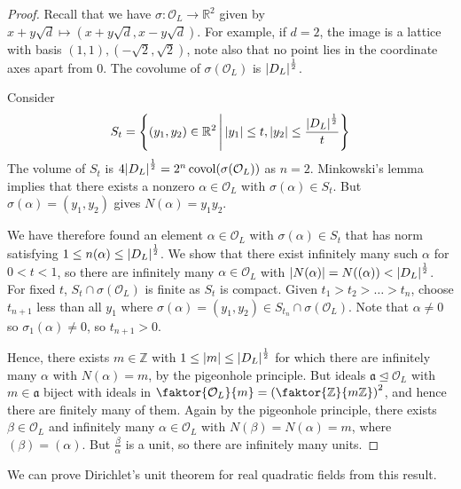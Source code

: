 \begin{proof}
    Recall that we have \( \sigma \colon \mathcal O_L \to \mathbb R^2 \) given by \( x + y\sqrt{d} \mapsto (x + y \sqrt{d}, x - y \sqrt{d}) \).
    For example, if \( d = 2 \), the image is a lattice with basis \( (1,1), (-\sqrt{2}, \sqrt{2}) \), note also that no point lies in the coordinate axes apart from 0.
    The covolume of \( \sigma(\mathcal O_L) \) is \( \abs{D_L}^{\frac{1}{2}} \).

    Consider
    \[ S_t = \qty{(y_1, y_2) \in \mathbb R^2 \,\middle|\,\abs{y_1} \leq t, \abs{y_2} \leq \frac{\abs{D_L}^{\frac{1}{2}}}{t}} \]
    The volume of \( S_t \) is \( 4\abs{D_L}^{\frac{1}{2}} = 2^n \operatorname{covol}(\sigma(\mathcal O_L)) \) as \( n = 2 \).
    Minkowski's lemma implies that there exists a nonzero \( \alpha \in \mathcal O_L \) with \( \sigma(\alpha) \in S_t \).
    But \( \sigma(\alpha) = (y_1, y_2) \) gives \( N(\alpha) = y_1 y_2 \).

    We have therefore found an element \( \alpha \in \mathcal O_L \) with \( \sigma(\alpha) \in S_t \) that has norm satisfying \( 1 \leq n(\alpha) \leq \abs{D_L}^{\frac{1}{2}} \).
    We show that there exist infinitely many such \( \alpha \) for \( 0 < t < 1 \), so there are infinitely many \( \alpha \in \mathcal O_L \) with \( \abs{N(\alpha)} = N((\alpha)) < \abs{D_L}^{\frac{1}{2}} \).
    For fixed \( t \), \( S_t \cap \sigma(\mathcal O_L) \) is finite as \( S_t \) is compact.
    Given \( t_1 > t_2 > \dots > t_n \), choose \( t_{n+1} \) less than all \( y_1 \) where \( \sigma(\alpha) = (y_1, y_2) \in S_{t_n} \cap \sigma(\mathcal O_L) \).
    Note that \( \alpha \neq 0 \) so \( \sigma_1(\alpha) \neq 0 \), so \( t_{n+1} > 0 \).

    Hence, there exists \( m \in \mathbb Z \) with \( 1 \leq \abs{m} \leq \abs{D_L}^{\frac{1}{2}} \) for which there are infinitely many \( \alpha \) with \( N(\alpha) = m \), by the pigeonhole principle.
    But ideals \( \mathfrak a \trianglelefteq \mathcal O_L \) with \( m \in \mathfrak a \) biject with ideals in \( \faktor{\mathcal O_L}{m} = \qty(\faktor{\mathbb Z}{m\mathbb Z})^2 \), and hence there are finitely many of them.
    Again by the pigeonhole principle, there exists \( \beta \in \mathcal O_L \) and infinitely many \( \alpha \in \mathcal O_L \) with \( N(\beta) = N(\alpha) = m \), where \( (\beta) = (\alpha) \).
    But \( \frac{\beta}{\alpha} \) is a unit, so there are infinitely many units.
\end{proof}
We can prove Dirichlet's unit theorem for real quadratic fields from this result.
